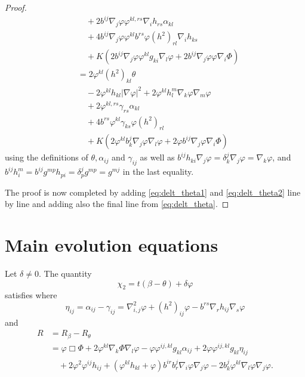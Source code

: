 \documentclass{amsart}
\begin{document}
\begin{proof}
\begin{equation}
\begin{split}
&\quad + 2 b^{ij} \nabla_j\varphi \varphi^{kl,rs}\nabla_i h_{rs} \alpha_{kl} \\
&\quad + 4 b^{ij} \nabla_j\varphi \varphi^{kl} b^{rs} \varphi(h^2)_{rl} \nabla_i h_{ks} \\
&\quad + K\left(2 b^{ij} \nabla_j\varphi \varphi^{kl}g_{ki} \nabla_l \varphi + 2 b^{ij} \nabla_j\varphi \varphi \nabla_i \Phi\right) \\
&= 2 \varphi^{kl}(h^2)_{kl}\theta \\
&\quad - 2 \varphi^{kl}h_{kl} |\nabla\varphi|^2 + 2 \varphi^{kl} h^{m}_{l} \nabla_k\varphi \nabla_m \varphi \\
&\quad + 2 \varphi^{kl,rs} \gamma_{rs} \alpha_{kl} \\
&\quad + 4 b^{rs} \varphi^{kl} \gamma_{ks} \varphi(h^2)_{rl} \\
&\quad + K\left(2 \varphi^{kl} b^j_k \nabla_j\varphi \nabla_l \varphi + 2 \varphi b^{ij} \nabla_j\varphi \nabla_i \Phi\right)
\end{split}
\end{equation}
using the definitions of \(\theta, \alpha_{ij}\) and \(\gamma_{ij}\) as well as \(b^{ij}h_{ki} \nabla_j \varphi = \delta^j_k \nabla_j \varphi = \nabla_k \varphi\), and \(b^{ij} h^m_i = b^{ij} g^{mp}h_{pi} = \delta^j_p g^{mp} = g^{mj}\) in the last equality.

The proof is now completed by adding \cref{eq:delt_theta1} and \cref{eq:delt_theta2} line by line and adding also the final line from \cref{eq:delt_theta}.
\end{proof}
\section{Main evolution equations}
\begin{lemma}
\label{thm:Evchi}
Let $\delta \neq 0.$ The quantity
\[
\chi_2 = t(\beta - \theta) + \delta\varphi
\]
satisfies
where
\[
\eta_{ij} = \alpha_{ij} - \gamma_{ij} = \nabla^2_{i,j}\varphi + (h^2)_{ij}\varphi - b^{rs}\nabla_r h_{ij}\nabla_s \varphi
\]
and
\[
\begin{split}
R &= R_{\beta} - R_{\theta} \\
&= \varphi \Box \Phi + 2\varphi^{kl} \nabla_k \Phi \nabla_l \varphi-\varphi \varphi^{ij,kl}g_{kl} \alpha_{ij} + 2\varphi \varphi^{ij,kl}g_{kl} \eta_{ij}  \\
&\quad + 2\varphi^{2}\varphi^{ij}h_{ij} +(\varphi^{kl}h_{kl} + \varphi)b^{ir}b^{j}_{r}\nabla_i \varphi\nabla_j\varphi - 2 b^{j}_{k}\varphi^{kl}\nabla_l\varphi\nabla_j\varphi.
\end{split}
\]

\end{lemma}
\end{document}
